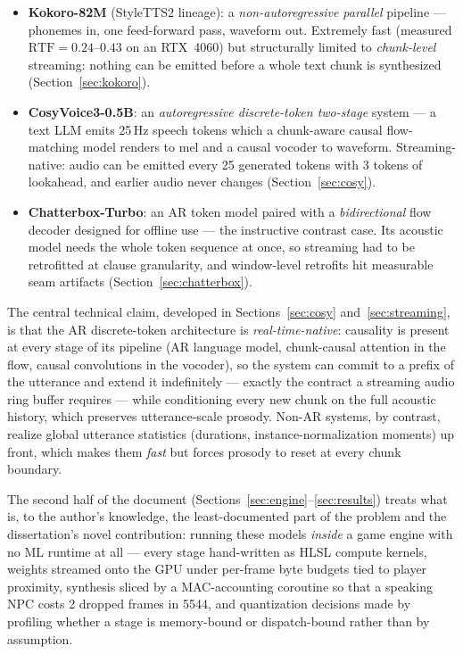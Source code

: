 \documentclass[11pt,a4paper]{article}
\newcommand{\RTF}{\ensuremath{\mathrm{RTF}}}
\begin{document}
\begin{itemize}[leftmargin=2em]
\item \textbf{Kokoro-82M} (StyleTTS2 lineage): a \emph{non-autoregressive parallel}
pipeline --- phonemes in, one feed-forward pass, waveform out. Extremely fast
(measured $\RTF{}=0.24$--$0.43$ on an RTX~4060) but structurally limited to
\emph{chunk-level} streaming: nothing can be emitted before a whole text chunk is
synthesized (Section~\ref{sec:kokoro}).
\item \textbf{CosyVoice3-0.5B}: an \emph{autoregressive discrete-token two-stage} system
--- a text LLM emits 25\,Hz speech tokens which a chunk-aware causal flow-matching model
renders to mel and a causal vocoder to waveform. Streaming-native: audio can be emitted
every 25 generated tokens with 3 tokens of lookahead, and earlier audio never changes
(Section~\ref{sec:cosy}).
\item \textbf{Chatterbox-Turbo}: an AR token model paired with a \emph{bidirectional}
flow decoder designed for offline use --- the instructive contrast case. Its acoustic
model needs the whole token sequence at once, so streaming had to be retrofitted at
clause granularity, and window-level retrofits hit measurable seam artifacts
(Section~\ref{sec:chatterbox}).
\end{itemize}

The central technical claim, developed in Sections~\ref{sec:cosy}
and~\ref{sec:streaming}, is that the AR discrete-token architecture is
\emph{real-time-native}: causality is present at every stage of its pipeline (AR language
model, chunk-causal attention in the flow, causal convolutions in the vocoder), so the
system can commit to a prefix of the utterance and extend it indefinitely --- exactly the
contract a streaming audio ring buffer requires --- while conditioning every new chunk on
the full acoustic history, which preserves utterance-scale prosody. Non-AR systems, by
contrast, realize global utterance statistics (durations, instance-normalization moments)
up front, which makes them \emph{fast} but forces prosody to reset at every chunk
boundary.

The second half of the document (Sections~\ref{sec:engine}--\ref{sec:results}) treats
what is, to the author's knowledge, the least-documented part of the problem and the
dissertation's novel contribution: running these models \emph{inside} a game engine with
no ML runtime at all --- every stage hand-written as HLSL compute kernels, weights
streamed onto the GPU under per-frame byte budgets tied to player proximity, synthesis
sliced by a MAC-accounting coroutine so that a speaking NPC costs 2 dropped frames in
5544, and quantization decisions made by profiling whether a stage is memory-bound or
dispatch-bound rather than by assumption.
\end{document}
